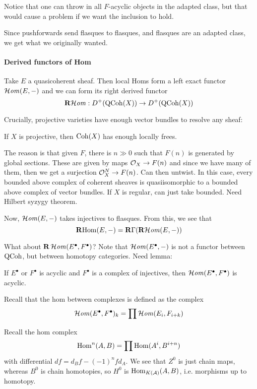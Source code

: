 Notice that one can throw in all $F$-acyclic objects in the adapted class, but that would cause a problem if we want the inclusion to hold.

Since pushforwards send flasques to flasques, and flasques are an adapted class, we get what we originally wanted.

\paragraph{Derived functors of Hom}

Take $E$ a quasicoherent sheaf. Then local Homs form a left exact functor $\operatorname{\mathcal{H}\mathit{om}}(E,-)$ and we can form its right derived functor $$\operatorname{\mathbf{R}\mathcal{H}\mathit{om}}:D^+(\operatorname{QCoh}(X))\to D^+(\operatorname{QCoh}(X))$$

Crucially, projective varieties have enough vector bundles to resolve any sheaf:

\begin{proposition}{}{}
    If $X$ is projective, then $\operatorname{Coh}(X)$ has enough locally frees.
\end{proposition}

The reason is that given $F$, there is $n\gg0$ such that $F(n)$ is generated by global sections. These are given by maps $\mathcal{O}_{X}\to F(n)$ and since we have many of them, then we get a surjection $\mathcal{O}_{X}^N\to F(n)$. Can then untwist. In this case, every bounded above complex of coherent sheaves is quasiisomorphic to a bounded above complex of vector bundles. If $X$ is regular, can just take bounded. Need Hilbert syzygy theorem.

Now, $\operatorname{\mathcal{H}\mathit{om}}(E,-)$ takes injectives to flasques. From this, we see that $$\operatorname{\mathbf{R} Hom}(E,-)=\operatorname{\mathbf{R}\Gamma}(\operatorname{\mathbf{R}\mathcal{H}\mathit{om}}(E,-))$$

What about $\mathbf{R}\operatorname{\mathcal{H}\mathit{om}}(E^\bullet, F^\bullet)$? Note that $\operatorname{\mathcal{H}\mathit{om}}(E^\bullet,-)$ is not a functor between $\operatorname{QCoh}$, but between homotopy categories. Need lemma:

\begin{lemma}{}{}
    If $E^\bullet$ or $F^\bullet$ is acyclic and $F^\bullet$ is a complex of injectives, then $\operatorname{\mathcal{H}\mathit{om}}(E^\bullet, F^\bullet)$ is acyclic.
\end{lemma}

Recall that the hom between complexes is defined as the complex $$\operatorname{\mathcal{H}\mathit{om}}(E^\bullet, F^\bullet)_{k}=\prod \operatorname{\mathcal{H}\mathit{om}}(E_{i}, F_{i+k})$$

Recall the hom complex $$\operatorname{Hom}^n(A,B)=\prod \operatorname{Hom} (A^i, B^{i+n})$$with differential $df=d_{B}f-(-1)^nfd_{A}$. We see that $Z^0$ is just chain maps, whereas $B^0$ is chain homotopies, so $H^0$ is $\operatorname{Hom}_{K(\mathcal{A})}(A,B)$, i.e. morphisms up to homotopy.

